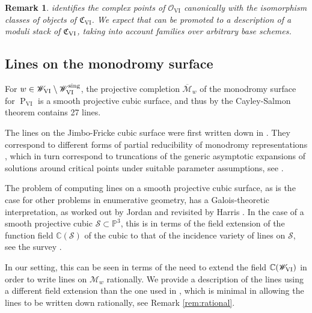 \documentclass[a4paper,reqno]{amsart}
\numberwithin{equation}{section}
\newcommand{\C}{\mathbb{C}}
\newcommand{\p}{\mathbb{P}}
\newcommand{\pain}[1]{\operatorname{P}_{\mathrm{#1}}}
\newtheorem{remark}[theorem]{Remark}
\numberwithin{equation}{section}
\begin{document}
\begin{remark} \label{rem:promotingtomodulistack}
     identifies the complex points of \(\mathscr O_{\mathrm{VI}}\) canonically with the isomorphism classes of objects of \(\mathfrak{ C}_{\mathrm{VI}}\). 
    We expect that  can be promoted to a description of a moduli stack of $\mathfrak{C}_{\rm{VI}}$, taking into account families over arbitrary base schemes.
\end{remark}



















\subsection{Lines on the monodromy surface}
For $w \in \mathscr{W}_{\rm{VI}}\setminus \mathscr{W}_{\rm{VI}}^{\operatorname{sing}}$, the projective completion $\overline{\mathcal{M}}_w$ of the monodromy surface for $\pain{VI}$ is a smooth projective cubic surface, and thus by the Cayley-Salmon theorem contains 27 lines. 

The lines on the Jimbo-Fricke cubic surface were first written down in \cite{mklimes2024}. They correspond to different forms of partial reducibility of monodromy representations \cites{mklimes2024,ORS}, which in turn correspond to truncations of the generic asymptotic expansions of solutions around critical points under suitable parameter assumptions, see \cite{guzzetti12}.

The problem of computing lines on a smooth projective cubic surface, as is the case for other problems in enumerative geometry, has a Galois-theoretic interpretation, as worked out by Jordan \cite{jordan1870} and revisited by Harris \cite{harris1979}.
In the case of a smooth projective cubic $\mathcal{S}\subset \p^3$, this is in terms of the field extension of the function field $\C(\mathcal{S})$ of the cubic to that of the incidence variety of lines on $\mathcal{S}$, see the survey \cite{sottileyahl}.

In our setting, this can be seen in terms of the need to extend the field $\C(\mathscr{W}_{\rm{VI}})$ in order to write lines on $\mathcal{M}_w$ rationally. 
We provide a description of the lines using a different field extension than the one used in \cite{mklimes2024}, which is minimal in allowing the lines to be written down rationally, see Remark \ref{rem:rational}.
\end{document}
